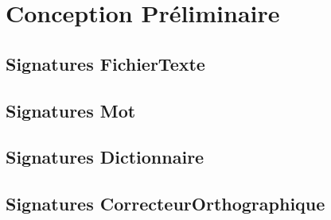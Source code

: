 \section{Conception Préliminaire}
	\subsection{Signatures FichierTexte}
		
		
	\subsection{Signatures Mot}
		
		
	\subsection{Signatures Dictionnaire}
		
		
	\subsection{Signatures CorrecteurOrthographique}
		
